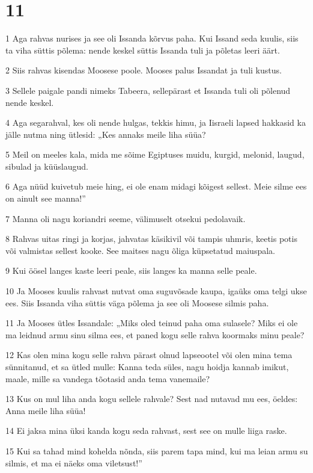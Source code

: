 \chapter{11}

\par 1 Aga rahvas nurises ja see oli Issanda kõrvus paha. Kui Issand seda kuulis, siis ta viha süttis põlema: nende keskel süttis Issanda tuli ja põletas leeri äärt.
\par 2 Siis rahvas kisendas Moosese poole. Mooses palus Issandat ja tuli kustus.
\par 3 Sellele paigale pandi nimeks Tabeera, sellepärast et Issanda tuli oli põlenud nende keskel.
\par 4 Aga segarahval, kes oli nende hulgas, tekkis himu, ja Iisraeli lapsed hakkasid ka jälle nutma ning ütlesid: „Kes annaks meile liha süüa?
\par 5 Meil on meeles kala, mida me sõime Egiptuses muidu, kurgid, melonid, laugud, sibulad ja küüslaugud.
\par 6 Aga nüüd kuivetub meie hing, ei ole enam midagi kõigest sellest. Meie silme ees on ainult see manna!”
\par 7 Manna oli nagu koriandri seeme, välimuselt otsekui pedolavaik.
\par 8 Rahvas uitas ringi ja korjas, jahvatas käsikivil või tampis uhmris, keetis potis või valmistas sellest kooke. See maitses nagu õliga küpsetatud maiuspala.
\par 9 Kui öösel langes kaste leeri peale, siis langes ka manna selle peale.
\par 10 Ja Mooses kuulis rahvast nutvat oma suguvõsade kaupa, igaüks oma telgi ukse ees. Siis Issanda viha süttis väga põlema ja see oli Moosese silmis paha.
\par 11 Ja Mooses ütles Issandale: „Miks oled teinud paha oma sulasele? Miks ei ole ma leidnud armu sinu silma ees, et paned kogu selle rahva koormaks minu peale?
\par 12 Kas olen mina kogu selle rahva pärast olnud lapseootel või olen mina tema sünnitanud, et sa ütled mulle: Kanna teda süles, nagu hoidja kannab imikut, maale, mille sa vandega tõotasid anda tema vanemaile?
\par 13 Kus on mul liha anda kogu sellele rahvale? Sest nad nutavad mu ees, öeldes: Anna meile liha süüa!
\par 14 Ei jaksa mina üksi kanda kogu seda rahvast, sest see on mulle liiga raske.
\par 15 Kui sa tahad mind kohelda nõnda, siis parem tapa mind, kui ma leian armu su silmis, et ma ei näeks oma viletsust!”
